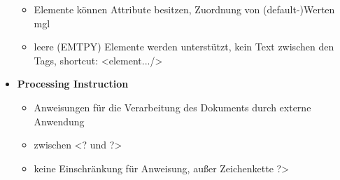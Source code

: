 \begin{itemize}
\begin{itemize}
		\item Elemente können Attribute besitzen, Zuordnung von (default-)Werten mgl
		\item leere (EMTPY) Elemente werden unterstützt, kein Text zwischen den Tags, shortcut: <element.../>
	\end{itemize}
	
	\item \textbf{Processing Instruction}
	\begin{itemize}
		\item Anweisungen für die Verarbeitung des Dokuments durch externe Anwendung
		\item zwischen <? und ?>
		\item keine Einschränkung für Anweisung, außer Zeichenkette ?>
	\end{itemize}
	

\end{itemize}

